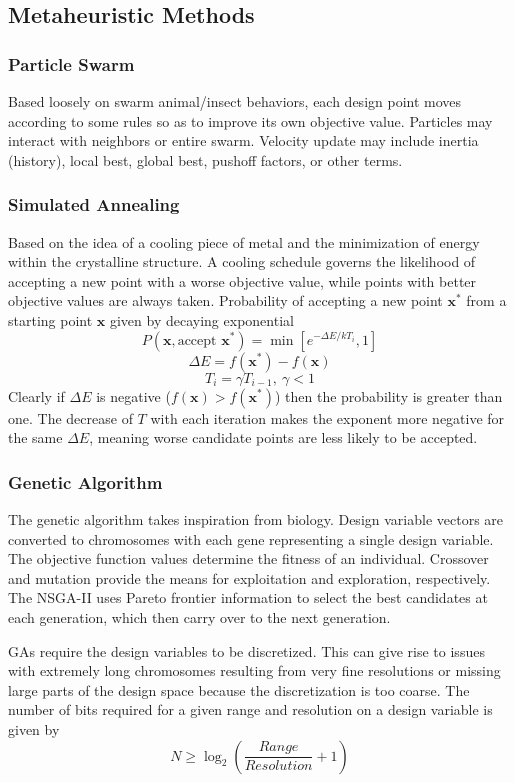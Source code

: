 \documentclass[11pt]{article}
\newcommand{\boldx}{\mathbf{x}}
\newcommand{\xstar}{\boldx^*}
\begin{document}
\subsection{Metaheuristic Methods}
\subsubsection{Particle Swarm}
Based loosely on swarm animal/insect behaviors, each design point moves according to some rules so as to improve its own objective value. Particles may interact with neighbors or entire swarm. Velocity update may include inertia (history), local best, global best, pushoff factors, or other terms.
\subsubsection{Simulated Annealing}
Based on the idea of a cooling piece of metal and the minimization of energy within the crystalline structure. A cooling schedule governs the likelihood of accepting a new point with a worse objective value, while points with better objective values are always taken. Probability of accepting a new point $\xstar$ from a starting point $\boldx$ given by decaying exponential
$$P(\boldx,\textrm{accept }\xstar) = \min\left[e^{-\Delta E/kT_i},1\right]$$
$$\Delta E = f(\xstar)-f(\boldx)$$
$$T_i=\gamma T_{i-1},\ \gamma<1$$
Clearly if $\Delta E$ is negative ($f(\boldx)>f(\xstar)$) then the probability is greater than one. The decrease of $T$ with each iteration makes the exponent more negative for the same $\Delta E$, meaning worse candidate points are less likely to be accepted.
\subsubsection{Genetic Algorithm}
The genetic algorithm takes inspiration from biology. Design variable vectors are converted to chromosomes with each gene representing a single design variable. The objective function values determine the fitness of an individual. Crossover and mutation provide the means for exploitation and exploration, respectively. The NSGA-II uses Pareto frontier information to select the best candidates at each generation, which then carry over to the next generation.

GAs require the design variables to be discretized. This can give rise to issues with extremely long chromosomes resulting from very fine resolutions or missing large parts of the design space because the discretization is too coarse. The number of bits required for a given range and resolution on a design variable is given by
$$N\geq\log_2\left(\frac{Range}{Resolution}+1\right)$$
\end{document}

